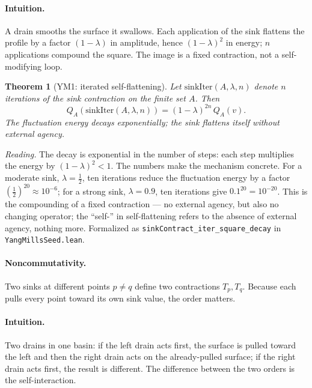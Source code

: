 \documentclass[aps,prd,preprint,superscriptaddress,amsmath,amssymb]{revtex4-2}
\newtheorem{theorem}{Theorem}[section]
\begin{document}
\paragraph{Intuition.}  A drain smooths the surface it swallows.  Each
application of the sink flattens the profile by a factor
$(1-\lambda)$ in amplitude, hence $(1-\lambda)^2$ in energy; $n$
applications compound the square.  The image is a fixed contraction,
not a self-modifying loop.

\begin{theorem}[YM1: iterated self-flattening]
\label{thm:ym1}
Let $\mathrm{sinkIter}(A,\lambda,n)$ denote $n$ iterations of the
sink contraction on the finite set $A$.  Then
\begin{equation}
Q_A(\mathrm{sinkIter}(A,\lambda,n)) = (1-\lambda)^{2n}\,Q_A(v).
\end{equation}
The fluctuation energy decays exponentially; the sink flattens itself
without external agency.
\end{theorem}

\emph{Reading.}  The decay is exponential in the number of steps:
each step multiplies the energy by $(1-\lambda)^2<1$.  The numbers
make the mechanism concrete.  For a moderate sink, $\lambda=\tfrac12$,
ten iterations reduce the fluctuation energy by a factor
$(\tfrac12)^{20}\approx 10^{-6}$; for a strong sink, $\lambda=0.9$,
ten iterations give $0.1^{20}=10^{-20}$.  This is the compounding of
a fixed contraction --- no external agency, but also no changing
operator; the ``self-'' in self-flattening refers to the absence of
external agency, nothing more.  Formalized as
\texttt{sinkContract\_iter\_square\_decay} in
\texttt{YangMillsSeed.lean}.

\paragraph{Noncommutativity.}
Two sinks at different points $p\neq q$ define two contractions
$T_p,T_q$.  Because each pulls every point toward its own sink value,
the order matters.

\paragraph{Intuition.}  Two drains in one basin: if the left drain
acts first, the surface is pulled toward the left and then the right
drain acts on the already-pulled surface; if the right drain acts
first, the result is different.  The difference between the two
orders is the self-interaction.
\end{document}
